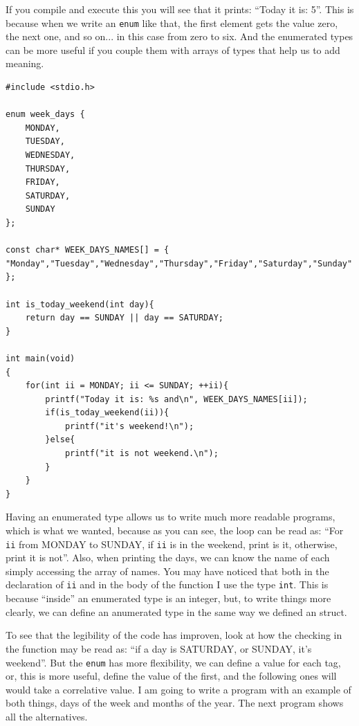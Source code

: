 \documentclass[a4paper]{article}
\begin{document}
If you compile and execute this you will see that it prints: ``Today it is: 5''.
This is because when we write an \verb!enum! like that, the first element gets
the value zero, the next one, and so on... in this case from zero to six. And
the enumerated types can be more useful if you couple them with arrays of types
that help us to add meaning.

\noindent
\begin{minipage}[H]{\linewidth}
\mbox{}
\begin{lstlisting}[style=C,
caption={Enum used alongside name array},
label={lst:EnumWithNames}]
#include <stdio.h>

enum week_days {
    MONDAY,
    TUESDAY,
    WEDNESDAY,
    THURSDAY,
    FRIDAY,
    SATURDAY,
    SUNDAY
};

const char* WEEK_DAYS_NAMES[] = { "Monday","Tuesday","Wednesday","Thursday","Friday","Saturday","Sunday" };

int is_today_weekend(int day){
    return day == SUNDAY || day == SATURDAY;
}

int main(void)
{
    for(int ii = MONDAY; ii <= SUNDAY; ++ii){
        printf("Today it is: %s and\n", WEEK_DAYS_NAMES[ii]);
        if(is_today_weekend(ii)){
            printf("it's weekend!\n");
        }else{
            printf("it is not weekend.\n");
        }
    }
}
\end{lstlisting}
\end{minipage}

Having an enumerated type allows us to write much more readable
programs, which is what we wanted, because as you can see, the loop can be read
as: ``For \verb!ii! from MONDAY to SUNDAY, if \verb!ii! is in the weekend,
print is it, otherwise, print it is not''. Also, when printing the days, we can
know the name of each simply accessing the array of names. You may have noticed
that both in the declaration of \verb!ii! and in the body of the function I use
the type \verb!int!. This is because ``inside'' an enumerated type is an
integer, but, to write things more clearly, we can define an anumerated type
in the same way we defined an struct.

To see that the legibility of the code has improven, look at how the checking
in the function may be read as: ``if a day is SATURDAY, or SUNDAY, it's
weekend''. But the \verb!enum! has more flexibility, we can define a value for
each tag, or, this is more useful, define the value of the first, and the
following ones will would take a correlative value. I am going to write a
program with an example of both things, days of the week and months of the
year. The next program shows all the alternatives.
\end{document}
